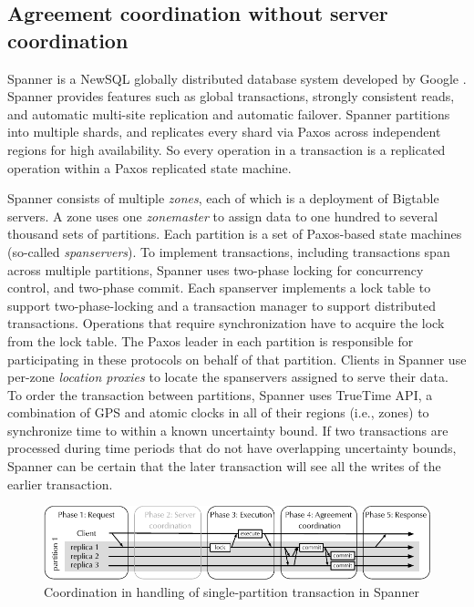\subsection{Agreement coordination without server coordination}

Spanner is a NewSQL \cite{Grolinger:2013tp} globally distributed database system
developed by Google \cite{corbett2013spanner}. Spanner provides features such as
global transactions, strongly consistent reads, and automatic multi-site
replication and automatic failover. Spanner partitions into multiple shards, and
replicates every shard via Paxos across independent regions for high
availability. So every operation in a transaction is a replicated operation
within a Paxos replicated state machine.

Spanner consists of multiple \emph{zones}, each of which is a deployment of
Bigtable servers. A zone uses one \emph{zonemaster} to assign data to one
hundred to several thousand sets of partitions. Each partition is a set of
Paxos-based state machines (so-called \emph{spanservers}).  To implement
transactions, including transactions span across multiple partitions, Spanner
uses two-phase locking for concurrency control, and two-phase commit. Each
spanserver implements a lock table to support two-phase-locking and a
transaction manager to support distributed transactions. Operations that
require synchronization have to acquire the lock from the lock table. The Paxos
leader in each partition is responsible for participating in these protocols on
behalf of that partition. Clients in Spanner use per-zone \emph{location
proxies} to locate the spanservers assigned to serve their data. To order the
transaction between partitions, Spanner uses TrueTime API, a combination of GPS
and atomic clocks in all of their regions (i.e., zones) to synchronize time to
within a known uncertainty bound. If two transactions are processed during time
periods that do not have overlapping uncertainty bounds, Spanner can be certain
that the later transaction will see all the writes of the earlier transaction.

\begin{figure}[ht!]
  \begin{minipage}[b]{1.0\linewidth}
  \centering
        \includegraphics[width=1\linewidth]{figures/spanner-single-partition}
  \end{minipage}
  \caption{Coordination in handling of single-partition transaction in Spanner}
  \label{fig:spanner-single-partition}
\end{figure}

